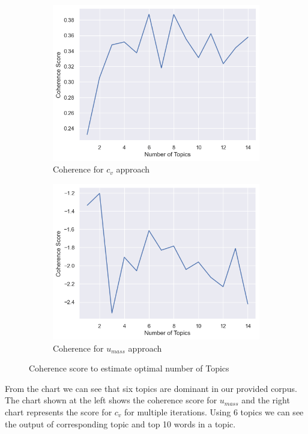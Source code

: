 \documentclass[sn-mathphys,Numbered]{sn-jnl}%
\theoremstyle{thmstyleone}%
\theoremstyle{thmstyletwo}%
\theoremstyle{thmstylethree}%
\begin{document}
\begin{figure}[h!]
\centering
\begin{subfigure}{0.45\textwidth}
    \includegraphics[width=\textwidth]{cv.png}
    \caption{Coherence for $c_v$ approach}
\end{subfigure}
\hfill
\begin{subfigure}{0.45\textwidth}
    \includegraphics[width=\textwidth]{umass.png}
    \caption{Coherence for $u_{mass}$ approach}
\end{subfigure}       
\caption{Coherence score to estimate optimal number of Topics}
\label{cv_umass}
\end{figure}

From the chart we can see that six topics are dominant in our provided
corpus. The chart shown at the left shows the coherence score for
\(u_{mass}\) and the right chart represents the score for \(c_{v}\) for
multiple iterations. Using 6 topics we can see the output of
corresponding topic and top 10 words in a topic.
\end{document}
